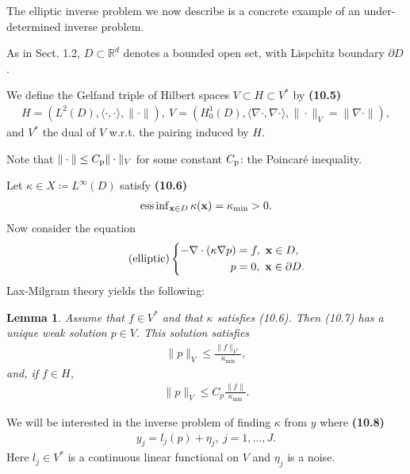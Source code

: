 \documentclass[oneside,11pt]{book}
\numberwithin{equation}{section}
\newtheorem{lemma}{Lemma}[section]
\begin{document}
The elliptic inverse problem we now describe is a concrete example of an under-determined inverse problem.

%
As in Sect. 1.2, $D\subset\mathbb{R}^d$ denotes a bounded open set, with Lispchitz boundary $\partial D$.

We define the Gelfand triple of Hilbert spaces $V\subset H\subset V^*$ by \textbf{(10.5)}
\begin{align*}
    H = (L^2(D),\langle\cdot,\cdot\rangle,\|\cdot\|),\ V = (H_0^1(D),\langle\nabla\cdot,\nabla\cdot\rangle,\|\cdot\|_V = \|\nabla\cdot\|),
\end{align*}
and $V^*$ the dual of $V$ w.r.t. the pairing induced by $H$.

Note that $\|\cdot\|\le C_{\rm p}\|\cdot\|_V$ for some constant $C_{\rm p}$: the Poincar\'e inequality.

%
Let $\kappa\in X\coloneqq L^\infty(D)$ satisfy \textbf{(10.6)}
\begin{align*}
    \operatorname{ess\inf}_{{\bf x}\in D} \kappa({\bf x}) = \kappa_{\min} > 0.
\end{align*}
Now consider the equation
\begin{equation*}
    \label{elliptic}
    \tag{elliptic}
    \left\{\begin{split}
        -\nabla\cdot(\kappa\nabla p) &= f,\ {\bf x}\in D,\\
        p &= 0,\ {\bf x}\in\partial D.
    \end{split}\right.    
\end{equation*}
Lax-Milgram theory yields the following:

\begin{lemma}
    Assume that $f\in V^*$ and that $\kappa$ satisfies (10.6). Then (10.7) has a unique weak solution $p\in V$. This solution satisfies
    \begin{align*}
        \|p\|_V\le\frac{\|f\|_{V^*}}{\kappa_{\min}},
    \end{align*}
    and, if $f\in H$,
    \begin{align*}
        \|p\|_V\le C_p\frac{\|f\|}{\kappa_{\min}}.
    \end{align*}
\end{lemma}
We will be interested in the inverse problem of finding $\kappa$ from $y$ where \textbf{(10.8)}
\begin{align*}
    y_j = l_j(p) + \eta_j,\ j = 1,\ldots,J.
\end{align*}
Here $l_j\in V^*$ is a continuous linear functional on $V$ and $\eta_j$ is a noise.
\end{document}
